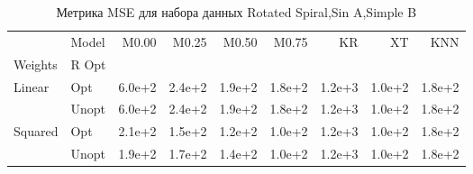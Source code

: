 \begin{table}
\caption{Метрика MSE для набора данных Rotated Spiral,Sin A,Simple B}
\label{tab:MSE_Rotated Spiral,Sin A,Simple B}
\begin{tabular}{llrrrrrrr}
\toprule
 & Model & M0.00 & M0.25 & M0.50 & M0.75 & KR & XT & KNN \\
Weights & R Opt &  &  &  &  &  &  &  \\
\midrule
\multirow[t]{2}{*}{Linear} & Opt & 6.0e+2 & 2.4e+2 & 1.9e+2 & 1.8e+2 & 1.2e+3 & 1.0e+2 & 1.8e+2 \\
 & Unopt & 6.0e+2 & 2.4e+2 & 1.9e+2 & 1.8e+2 & 1.2e+3 & 1.0e+2 & 1.8e+2 \\

\multirow[t]{2}{*}{Squared} & Opt & 2.1e+2 & 1.5e+2 & 1.2e+2 & 1.0e+2 & 1.2e+3 & 1.0e+2 & 1.8e+2 \\
 & Unopt & 1.9e+2 & 1.7e+2 & 1.4e+2 & 1.0e+2 & 1.2e+3 & 1.0e+2 & 1.8e+2 \\

\bottomrule
\end{tabular}
\end{table}
